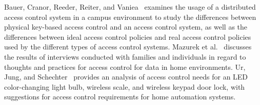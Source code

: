 Bauer, Cranor, Reeder, Reiter, and Vaniea~\cite{policyCreation} examines the
usage of a distributed access control system in a campus environment to study
the differences between physical key-based access control and an access control
system, as well as the differences between ideal access control policies and
real access control policies used by the different types of access control
systems. Mazurek et al.~\cite{accessControl} discusses the results of interviews
conducted with families and individuals in regard to thoughts and practices for
access control for data in home environments. Ur, Jung, and
Schechter~\cite{currentState} provides an analysis of access control needs for
an LED color-changing light bulb, wireless scale, and wireless keypad door lock,
with suggestions for access control requirements for home automation systems.
